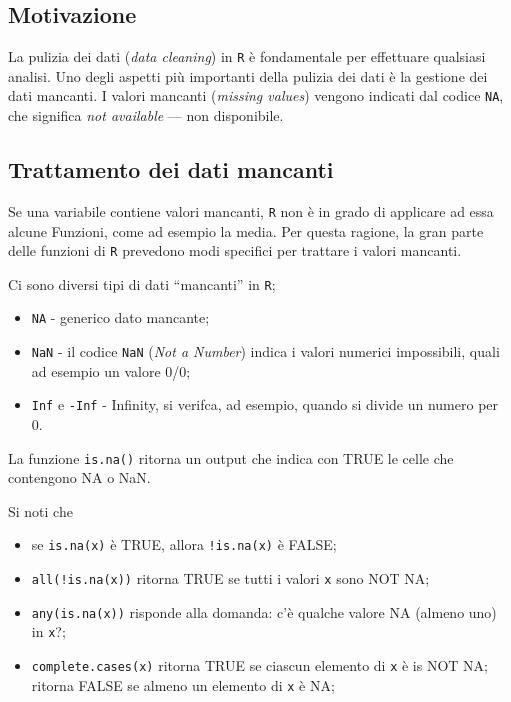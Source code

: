 \documentclass[
]{memoir}
\providecommand{\tightlist}{%
  \setlength{\itemsep}{0pt}\setlength{\parskip}{0pt}}
\theoremstyle{definition}
\theoremstyle{definition}
\theoremstyle{definition}
\theoremstyle{definition}
\theoremstyle{remark}
\begin{document}
\hypertarget{motivazione-1}{%
\subsection{Motivazione}\label{motivazione-1}}

La pulizia dei dati (\emph{data cleaning}) in \texttt{R} è fondamentale per effettuare qualsiasi analisi. Uno degli aspetti più importanti della pulizia dei dati è la gestione dei dati mancanti. I valori mancanti (\emph{missing values}) vengono indicati dal codice \texttt{NA}, che significa \emph{not available} --- non disponibile.

\hypertarget{trattamento-dei-dati-mancanti}{%
\subsection{Trattamento dei dati mancanti}\label{trattamento-dei-dati-mancanti}}

Se una variabile contiene valori mancanti, \texttt{R} non è in grado di applicare ad essa alcune Funzioni, come ad esempio la media. Per questa ragione, la gran parte delle funzioni di \texttt{R} prevedono modi specifici per trattare i valori mancanti.

Ci sono diversi tipi di dati ``mancanti'' in \texttt{R};

\begin{itemize}
\tightlist
\item
  \texttt{NA} - generico dato mancante;
\item
  \texttt{NaN} - il codice \texttt{NaN} (\emph{Not a Number}) indica i valori numerici impossibili, quali ad esempio un valore 0/0;
\item
  \texttt{Inf} e \texttt{-Inf} - Infinity, si verifca, ad esempio, quando si divide un numero per 0.
\end{itemize}

La funzione \texttt{is.na()} ritorna un output che indica con TRUE le celle che contengono NA o NaN.

Si noti che

\begin{itemize}
\tightlist
\item
  se \texttt{is.na(x)} è TRUE, allora \texttt{!is.na(x)} è FALSE;
\item
  \texttt{all(!is.na(x))} ritorna TRUE se tutti i valori \texttt{x} sono NOT NA;
\item
  \texttt{any(is.na(x))} risponde alla domanda: c'è qualche valore NA (almeno uno) in \texttt{x}?;
\item
  \texttt{complete.cases(x)} ritorna TRUE se ciascun elemento di \texttt{x} è is NOT NA; ritorna FALSE se almeno un elemento di \texttt{x} è NA;
\end{itemize}
\end{document}
